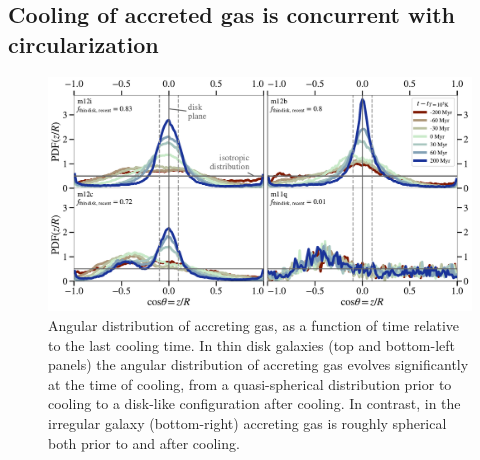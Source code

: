 \documentclass[fleqn,usenatbib]{mnras}
\newcommand{\Rcon}{R_{T=10^5\,{\rm K}}}
\begin{document}


\subsection{Cooling of accreted gas is concurrent with circularization}
\label{s: characteristics -- aligns}

\begin{figure}
    \centering
    \includegraphics[width=\textwidth]{figures/theta_vs_t.pdf}
    \caption{
    Angular distribution of accreting gas, as a function of time relative to the last cooling time. In thin disk galaxies (top and bottom-left panels) the angular distribution of accreting gas evolves significantly at the time of cooling, from a quasi-spherical distribution prior to cooling to a disk-like configuration after cooling. 
    In contrast, in the irregular galaxy (bottom-right) accreting gas is roughly spherical both prior to and after cooling.
    }
    \label{f: theta vs t}
\end{figure}
\end{document}
